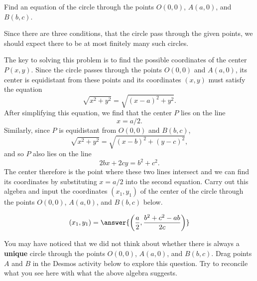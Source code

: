 \documentclass{ximera}
\begin{document}
\begin{example}  \label{Ex7}
Find an equation of the circle through the points $O(0,0)$, $A(a,0)$, and $B(b,c)$.
\end{example}

\begin{explanation}
Since there are three conditions, that the circle pass through the given points, we should expect there to be at most finitely many such circles. 

The key to solving this problem is to find the possible coordinates of the center $P(x,y)$. Since the circle passes through the points $O(0,0)$ and $A(a,0)$, its center is equidistant from these points and its coordinates $(x,y)$ must satisfy the equation
\[
    \sqrt{x^2 + y^2} = \sqrt{(x-a)^2+y^2} .
\]
After simplifying this equation, we find that the center $P$ lies on the line  
\[
   x = a/2.
\]
Similarly, since $P$ is equidistant from $O(0,0)$ and $B(b,c)$,
\[
  \sqrt{x^2 + y^2} = \sqrt{(x-b)^2+(y-c)^2} ,
\]
and so $P$ also lies on the line 
\[
  2bx + 2cy = b^2 + c^2 .
\]
The center therefore is the point where these two lines intersect and we can find its coordinates by substituting $x=a/2$ into the second equation. Carry out this algebra and input the coordinates $(x_1,y_1)$ of the center of the circle through the points $O(0,0)$, $A(a,0)$, and $B(b,c)$ below.

\begin{question}
\[
  (x_1, y_1) = \answer{ \left( \frac{a}{2}  ,  \frac{b^2+c^2-ab}{2c}   \right)} 
\]
\end{question}





\begin{exploration}\label{exp:circle7}
You may have noticed that we did not think about whether there is always a {\bf unique} circle through the points $O(0,0)$, $A(a,0)$, and $B(b,c)$. Drag points $A$ and $B$ in the Desmos activity below to explore this question. Try to reconcile what you see here with what the above algebra suggests.
 
 
\begin{onlineOnly}
    \begin{center}
\end{center}
\end{onlineOnly}
\end{exploration}

\end{explanation}
\end{document}
